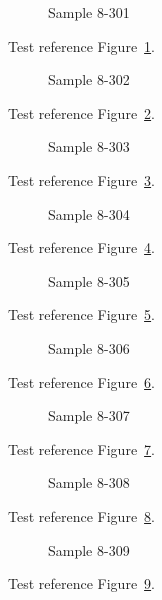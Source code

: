 \begin{figure}[tbhp]
\caption{Sample 8-301}
\label{fig:sample-8-301}
\end{figure}

Test reference Figure~\ref{fig:sample-8-301}.

\begin{figure}[tbhp]
\caption{Sample 8-302}
\label{fig:sample-8-302}
\end{figure}

Test reference Figure~\ref{fig:sample-8-302}.

\begin{figure}[tbhp]
\caption{Sample 8-303}
\label{fig:sample-8-303}
\end{figure}

Test reference Figure~\ref{fig:sample-8-303}.

\begin{figure}[tbhp]
\caption{Sample 8-304}
\label{fig:sample-8-304}
\end{figure}

Test reference Figure~\ref{fig:sample-8-304}.

\begin{figure}[tbhp]
\caption{Sample 8-305}
\label{fig:sample-8-305}
\end{figure}

Test reference Figure~\ref{fig:sample-8-305}.

\begin{figure}[tbhp]
\caption{Sample 8-306}
\label{fig:sample-8-306}
\end{figure}

Test reference Figure~\ref{fig:sample-8-306}.

\begin{figure}[tbhp]
\caption{Sample 8-307}
\label{fig:sample-8-307}
\end{figure}

Test reference Figure~\ref{fig:sample-8-307}.

\begin{figure}[tbhp]
\caption{Sample 8-308}
\label{fig:sample-8-308}
\end{figure}

Test reference Figure~\ref{fig:sample-8-308}.

\begin{figure}[tbhp]
\caption{Sample 8-309}
\label{fig:sample-8-309}
\end{figure}

Test reference Figure~\ref{fig:sample-8-309}.

